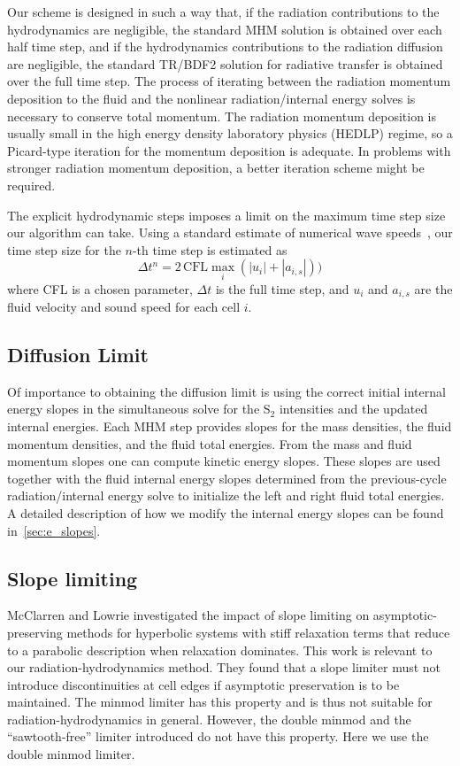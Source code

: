 \documentclass[preprint,12pt]{elsarticle}
\begin{document}
Our scheme is designed in such a way that, 
if the radiation contributions to the hydrodynamics are negligible, the standard MHM solution is obtained over each half time step, and if the hydrodynamics contributions to 
the radiation diffusion are negligible, the standard TR/BDF2 solution for radiative transfer is obtained over the full time step.  The process of iterating 
between the radiation momentum deposition to the fluid and the nonlinear radiation/internal energy solves is necessary to conserve total momentum.  
The radiation momentum deposition is usually small in the high energy density laboratory physics (HEDLP) regime, so a Picard-type iteration for the
momentum deposition is adequate.  In problems 
with stronger radiation momentum deposition, a better iteration scheme might be required. 

The explicit hydrodynamic steps imposes a limit on the maximum time step size our
algorithm can take.
Using a standard estimate of numerical wave speeds~\cite{toro}, our time step size for the $n$-th time
step is estimated as
\begin{equation}\label{eq:cfl}
    \Delta t^n = 2\,\text{CFL} \max_{i}\left(|u_i| + |a_{i,s}|\right))
\end{equation}
where CFL is a chosen parameter, $\Delta t$ is the full time step, and $u_i$ and $a_{i,s}$ are the fluid velocity
and sound speed for each cell $i$.


\subsection{Diffusion Limit}
\label{sec:diffusion-limit}
Of importance to obtaining the diffusion limit is using the correct initial internal energy slopes in the simultaneous solve for the 
S$_2$ intensities and the updated internal energies.  Each MHM step provides slopes for the mass densities, the fluid momentum densities, 
and the fluid total energies.  From the mass and fluid momentum slopes one can compute kinetic energy slopes.  These slopes are used 
together with the fluid internal energy slopes determined from the previous-cycle radiation/internal energy solve to initialize the left and right 
fluid total energies. A detailed description of how we modify the internal energy slopes can be found in~\ref{sec:e_slopes}.

\subsection{Slope limiting}
McClarren and Lowrie \cite{mclow2008} investigated the impact of slope limiting on asymptotic-preserving methods for hyperbolic systems with stiff 
relaxation terms that reduce to a parabolic description when relaxation dominates.  This work is relevant to our radiation-hydrodynamics method. 
They found that a slope limiter must not introduce discontinuities at cell edges if asymptotic preservation is to be maintained.  The minmod limiter 
has this property and is thus not suitable for radiation-hydrodynamics in general.  However, the double minmod and the ``sawtooth-free'' limiter 
introduced do not have this property.  Here we use the double minmod limiter.   
\end{document}
